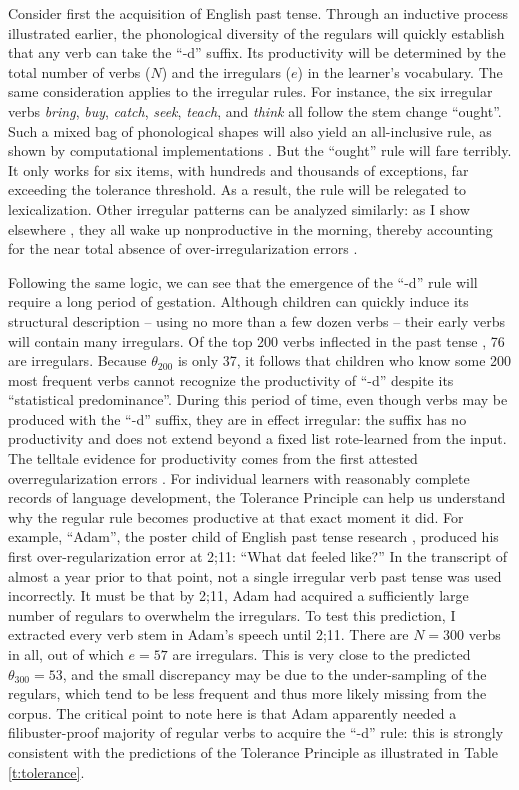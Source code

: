 \documentclass[output=paper,
modfonts
]{LSP/langsci}
\begin{document}
Consider first the acquisition of English past tense.  Through an
inductive process illustrated earlier, 
the phonological diversity of the regulars will quickly
establish that any verb can take the ``{-d}'' suffix. Its productivity
will be determined by the total number of verbs ($N$) and the
irregulars ($e$) in the learner's vocabulary.  The same consideration
applies to the irregular rules. For instance, the six irregular verbs
\textit{bring}, \textit{buy}, \textit{catch}, \textit{seek}, \textit{teach}, and \textit{think}  all follow the stem change ``ought''. Such a mixed bag of
phonological shapes will also yield an all-inclusive rule, as
shown by computational implementations \citep{Yip1998a}. But the ``ought''
 rule will fare terribly. It only works for 
six items, with hundreds and thousands of exceptions,  far
exceeding the tolerance threshold. As a result, the rule 
will be relegated to
lexicalization.  Other irregular patterns can be analyzed similarly:
as I show elsewhere \citep[][Chapter 4]{POP}, they all
wake up nonproductive in the morning, thereby accounting for the near
total absence of over-irregularization errors \citep{Xu1995}.

Following the same logic, we can see that the emergence of the ``-d''
rule will require a long period of gestation. Although children  can quickly
induce its structural description -- using no more than a few dozen verbs
\citep[again][]{Yip1998a} -- their early verbs will contain 
many irregulars.  Of the top
200 verbs inflected in the past tense \citep{CHILDES}, 76 are
irregulars. Because  $\theta_{200}$ is only 37, 
it follows that children who know some 200 most frequent verbs cannot
recognize  the productivity of ``-d'' despite its ``statistical
predominance''. During this period of time, even though verbs may be
produced with the ``-d'' suffix, they are in 
effect irregular: the suffix has no productivity and does not
extend beyond a fixed list rote-learned from the input. The telltale
evidence for productivity comes from the first attested overregularization
errors \citep{Marcus1992}. For individual learners with reasonably
complete records of language development,  the Tolerance Principle can
help us understand  why the regular rule becomes productive at that
exact moment it did. For example, ``Adam'', the poster child of English past
tense research \citep{Pinker1999}, produced his first
over-regularization error at 2;11: ``What dat feeled like?'' In the
transcript of almost a year prior to that point, not a single
irregular verb past tense was used incorrectly. It must be 
that by 2;11, Adam had acquired a sufficiently large number of
regulars to overwhelm the irregulars. To test this prediction, I
extracted every verb stem in Adam's speech until 2;11. There are $N =
300$ verbs in all, out of which $e = 57$ are irregulars. This is very
close to the predicted $\theta_{300} = 53$, and the small discrepancy
may be due to the under-sampling of the regulars,  which tend to be
less frequent and thus  more likely missing  from the corpus. The critical
point to note here is that Adam apparently needed 
a filibuster-proof majority of regular verbs to acquire the ``-d''
rule:  this is strongly consistent with the predictions of the
Tolerance Principle as illustrated in Table \ref{t:tolerance}. 
\end{document}
